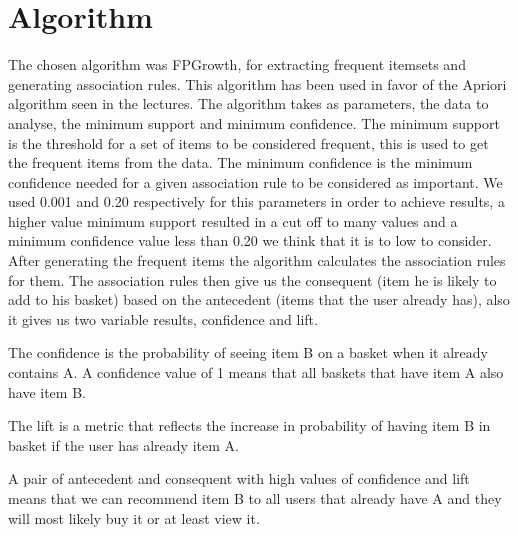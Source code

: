 \section{Algorithm}
\label{algorithm}

The chosen algorithm was FPGrowth, for extracting frequent itemsets and generating association rules.
This algorithm has been used in favor of the Apriori algorithm seen in the lectures.
The algorithm takes as parameters, the data to analyse, the minimum support and minimum confidence. 
The minimum support is the threshold for a set of items to be considered frequent, 
this is used to get the frequent items from the data.
The minimum confidence is the minimum confidence needed for a given association rule to be considered as important.
We used 0.001 and 0.20 respectively for this parameters in order to achieve results, a higher value minimum support 
resulted in a cut off to many values and a minimum confidence value less than 0.20 we think that it is to 
low to consider.
After generating the frequent items the algorithm calculates the association rules for them.
The association rules then give us the consequent (item he is likely to add to his basket) based on
the antecedent (items that the user already has), also it gives us two variable results, confidence and lift.

The confidence is the probability of seeing item B on a basket when it already contains A. A confidence value of 1
means that all baskets that have item A also have item B.

The lift is a metric that reflects the increase in probability of having item B in basket if the user has already
item A.

A pair of antecedent and consequent with high values of confidence and lift means that we can recommend item B to all
users that already have A and they will most likely buy it or at least view it. 